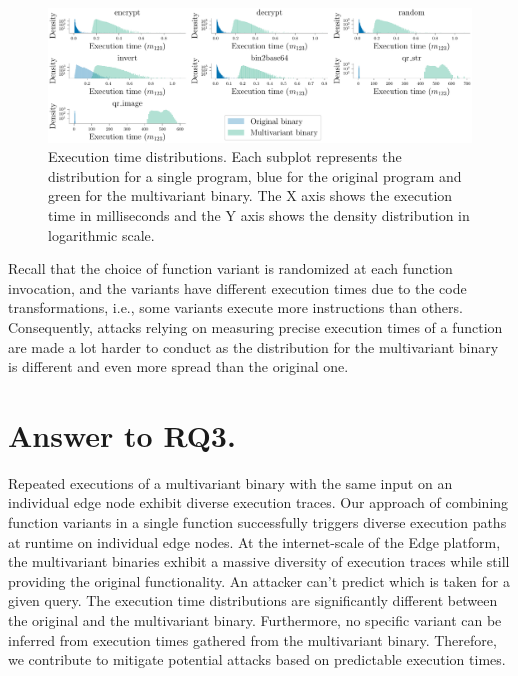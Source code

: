 \begin{figure}[h]
    \includegraphics[width=\linewidth]{plots/times.pdf}
    \caption{Execution time distributions. Each subplot represents the distribution for a single program, blue for the original program and green for the multivariant binary. The X axis shows the execution time in milliseconds and the Y axis shows the density distribution in logarithmic scale.}
    \label{rq3:diversity:times}
\end{figure}

Recall that the choice of function variant is randomized at each function invocation, and the variants have different execution times due to the code transformations, i.e., some variants execute more instructions than others. 
Consequently, attacks relying on measuring precise execution times \cite{blackhatpaper} of a function are made a lot harder to conduct as the distribution for the multivariant binary is different and even more spread than the original one.

\section{Answer to RQ3.}



Repeated executions of a multivariant binary with the same input on an individual edge node exhibit diverse execution traces. Our approach of combining function variants in a single function successfully triggers diverse execution paths at runtime on individual edge nodes. 
At the internet-scale of the Edge platform, the multivariant binaries exhibit a massive diversity of execution traces while still providing the original functionality.
An attacker can't predict which is taken for a given query.
The execution time distributions are significantly different between the original and the multivariant binary. Furthermore, no specific variant can be inferred from execution times gathered from the multivariant binary. Therefore, we contribute to mitigate potential attacks based on predictable execution times.